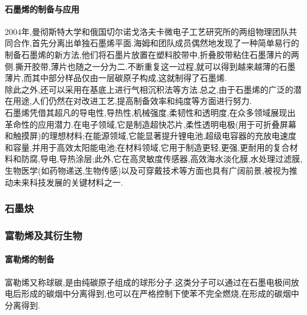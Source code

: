 \documentclass[draft]{ctexart}
\begin{document}
\paragraph{石墨烯的制备与应用}
2004年,曼彻斯特大学和俄国切尔诺戈洛夫卡微电子工艺研究所的两组物理团队共同合作,首先分离出单独石墨烯平面.海姆和团队成员偶然地发现了一种简单易行的制备石墨烯的新方法,他们将石墨片放置在塑料胶带中,折叠胶带粘住石墨薄片的两侧.撕开胶带,薄片也随之一分为二.不断重复这一过程,就可以得到越来越薄的石墨薄片,而其中部分样品仅由一层碳原子构成,这就制得了石墨烯.\\
\indent 除此之外,还可以采用在基底上进行气相沉积法等方法.总之,由于石墨烯的广泛的潜在用途,人们仍然在对改进工艺,提高制备效率和纯度等方面进行努力.\\
\indent 石墨烯凭借其超凡的导电性,导热性,机械强度,柔韧性和透明度,在众多领域展现出革命性的应用潜力.在电子领域,它是制造超快芯片,柔性透明电极(用于可折叠屏幕和触摸屏)的理想材料;在能源领域,它能显著提升锂电池,超级电容器的充放电速度和容量,并用于高效太阳能电池;在材料领域,它用于制造更轻,更强,更耐用的复合材料和防腐,导电,导热涂层;此外,它在高灵敏度传感器,高效海水淡化膜,水处理过滤膜,生物医学(如药物递送,生物传感)以及可穿戴技术等方面也具有广阔前景,被视为推动未来科技发展的关键材料之一.
\subsubsection{石墨炔}
\subsubsection{富勒烯及其衍生物}
\paragraph{富勒烯的制备}
富勒烯又称球碳,是由纯碳原子组成的球形分子.这类分子可以通过在石墨电极间放电后形成的碳烟中分离得到,也可以在严格控制下使苯不完全燃烧,在形成的碳烟中分离得到.
\end{document}
